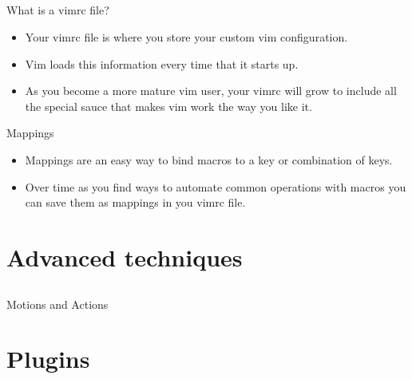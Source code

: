 \documentclass{beamer}
\begin{document}
    \subsection{}
    \begin{frame}{What is a vimrc file?}
        \begin{itemize}
            \item Your vimrc file is where you store your custom vim configuration.
            \item Vim loads this information every time that it starts up.
            \item As you become a more mature vim user, your vimrc will grow to include all the special sauce that makes vim work the way you like it.
        \end{itemize}
    \end{frame}
    \begin{frame}{Mappings}
        \begin{itemize}
            \item Mappings are an easy way to bind macros to a key or combination of keys.
            \item Over time as you find ways to automate common operations with macros you can save them as mappings in you vimrc file.
        \end{itemize}
    \end{frame}
    \section{Advanced techniques}
    \subsection{}
    \begin{frame}{Motions and Actions}
    \end{frame}
    \section{Plugins}
\end{document}
